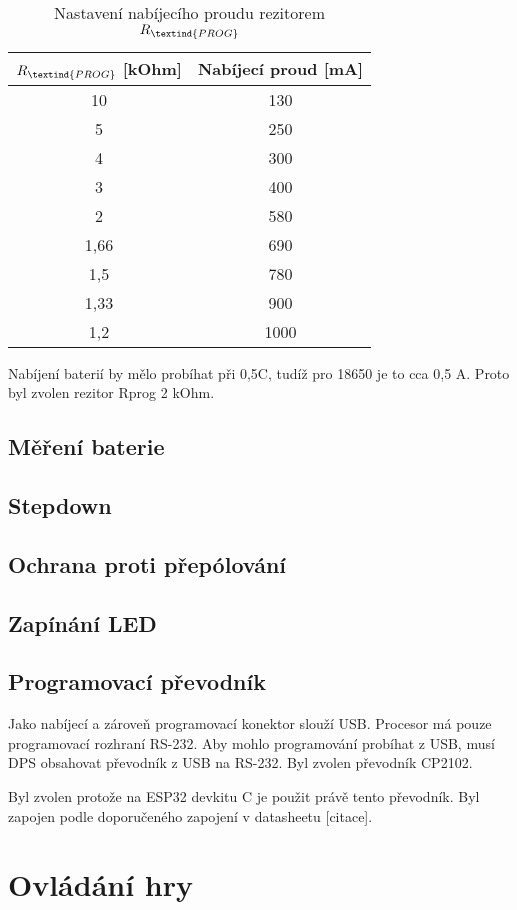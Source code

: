 \begin{table}[!h]
    \caption{Nastavení nabíjecího proudu rezitorem $R_\textind{PROG}$}
    \begin{center}
        \begin{tabular}{|c|c|}
            \hline
            $R_\textind{PROG}$ [kOhm] & Nabíjecí proud [mA] \\
            \hline
            10      & 130 \\
            \hline
            5       & 250 \\
            \hline
            4       & 300 \\
            \hline
            3       & 400 \\
            \hline
            2       & 580 \\
            \hline
            1,66    & 690 \\
            \hline
            1,5     & 780 \\
            \hline
            1,33    & 900 \\
            \hline
            1,2     & 1000 \\
            \hline
        \end{tabular}
        
    \end{center}
\end{table}

Nabíjení baterií by mělo probíhat při 0,5C, tudíž pro 18650 je to cca 0,5 A. Proto byl zvolen rezitor Rprog 2 kOhm.

\section{Měření baterie}

\section{Stepdown}

\section{Ochrana proti přepólování}

\section{Zapínání LED}

\section{Programovací převodník}
Jako nabíjecí a zároveň programovací konektor slouží USB. Procesor má pouze programovací rozhraní RS-232. Aby mohlo programování probíhat z USB, 
musí DPS obsahovat převodník z USB na RS-232. Byl zvolen převodník CP2102. 

Byl zvolen protože na ESP32 devkitu C je použit právě tento převodník. Byl zapojen podle doporučeného zapojení v datasheetu [citace].

\chapter{Ovládání hry}